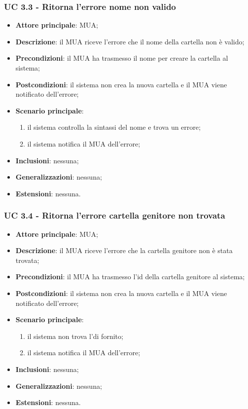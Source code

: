     \subsubsection{UC 3.3 - Ritorna l'errore nome non valido} \label{sec:UC3.3}
    \begin{itemize}
        \item \textbf{Attore principale}: MUA;
        \item \textbf{Descrizione}: il MUA riceve l'errore che il nome della cartella non è valido;
        \item \textbf{Precondizioni}:  il MUA ha trasmesso il nome per creare la cartella al sistema;
        \item \textbf{Postcondizioni}: il sistema non crea la nuova cartella e il MUA viene notificato dell'errore;
        \item \textbf{Scenario principale}:
            \begin{enumerate}
                \item il sistema controlla la sintassi del nome e trova un errore;
                \item il sistema notifica il MUA dell'errore;
            \end{enumerate}
        \item \textbf{Inclusioni}: nessuna;
        \item \textbf{Generalizzazioni}: nessuna;
        \item \textbf{Estensioni}: nessuna.
    \end{itemize}

    \subsubsection{UC 3.4 - Ritorna l'errore cartella genitore non trovata} \label{sec:UC3.4}
    \begin{itemize}
        \item \textbf{Attore principale}: MUA;
        \item \textbf{Descrizione}: il MUA riceve l'errore che la cartella genitore non è stata trovata;
        \item \textbf{Precondizioni}: il MUA ha trasmesso l'id della cartella genitore al sistema;
        \item \textbf{Postcondizioni}: il sistema non crea la nuova cartella e il MUA viene notificato dell'errore;
        \item \textbf{Scenario principale}:
            \begin{enumerate}
                \item il sistema non trova l'di fornito;
                \item il sistema notifica il MUA dell'errore;
            \end{enumerate}
        \item \textbf{Inclusioni}: nessuna;
        \item \textbf{Generalizzazioni}: nessuna;
        \item \textbf{Estensioni}: nessuna.
    \end{itemize}

